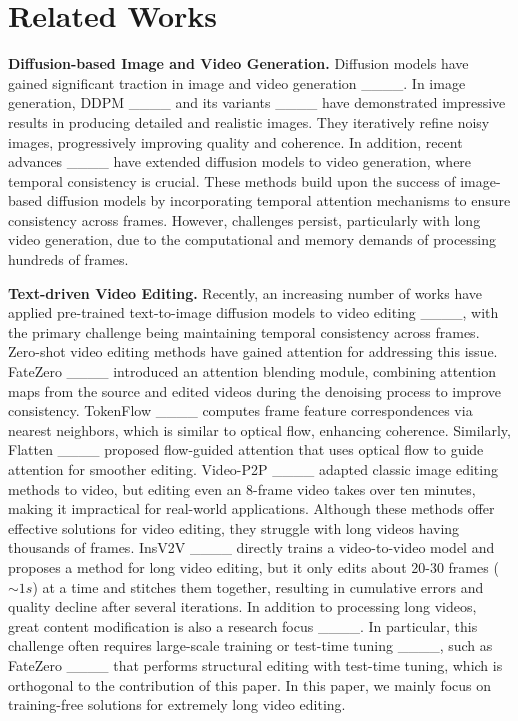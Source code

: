 \section{Related Works}
\textbf{Diffusion-based Image and Video Generation.} Diffusion models have gained significant traction in image and video generation ____. In image generation, DDPM ____ and its variants ____ have demonstrated impressive results in producing detailed and realistic images. They iteratively refine noisy images, progressively improving quality and coherence. In addition, recent advances ____ have extended diffusion models to video generation, where temporal consistency is crucial. These methods build upon the success of image-based diffusion models by incorporating temporal attention mechanisms to ensure consistency across frames. However, challenges persist, particularly with long video generation, due to the computational and memory demands of processing hundreds of frames.

\textbf{Text-driven Video Editing.} Recently, an increasing number of works have applied pre-trained text-to-image diffusion models to video editing ____, with the primary challenge being maintaining temporal consistency across frames. Zero-shot video editing methods have gained attention for addressing this issue. 
FateZero ____ introduced an attention blending module, combining attention maps from the source and edited videos during the denoising process to improve consistency. 
TokenFlow ____ computes frame feature correspondences via nearest neighbors, which is similar to optical flow, enhancing coherence. 
Similarly, Flatten ____ proposed flow-guided attention that uses optical flow to guide attention for smoother editing. 
Video-P2P ____ adapted classic image editing methods to video, but editing even an 8-frame video takes over ten minutes, making it impractical for real-world applications. Although these methods offer effective solutions for video editing, they struggle with long videos having thousands of frames.
InsV2V ____ directly trains a video-to-video model and proposes a method for long video editing, but it only edits about 20-30 frames ($\sim1s$) at a time and stitches them together, resulting in cumulative errors and quality decline after several iterations. In addition to processing long videos, great content modification is also a research focus ____. In particular, this challenge often requires large-scale training or test-time tuning ____, such as FateZero ____ that performs structural editing with test-time tuning, which is orthogonal to the contribution of this paper. In this paper, we mainly focus on training-free solutions for extremely long video editing.

